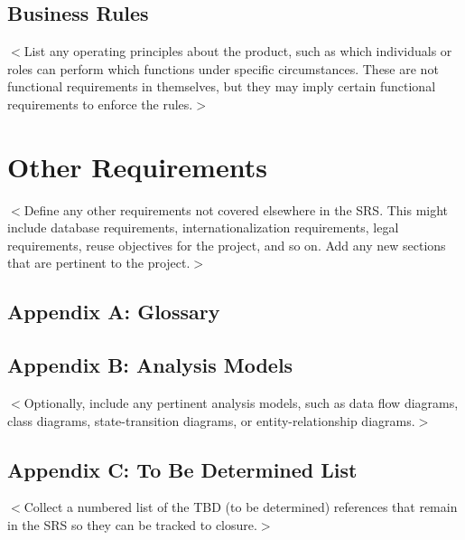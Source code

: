 \documentclass{scrreprt}
\begin{document}
\section{Business Rules}
$<$List any operating principles about the product, such as which individuals or 
roles can perform which functions under specific circumstances. These are not 
functional requirements in themselves, but they may imply certain functional 
requirements to enforce the rules.$>$


\chapter{Other Requirements}
$<$Define any other requirements not covered elsewhere in the SRS. This might 
include database requirements, internationalization requirements, legal 
requirements, reuse objectives for the project, and so on. Add any new sections 
that are pertinent to the project.$>$

\section{Appendix A: Glossary}
\printglossary[type=\acronymtype]

\section{Appendix B: Analysis Models}
$<$Optionally, include any pertinent analysis models, such as data flow 
diagrams, class diagrams, state-transition diagrams, or entity-relationship 
diagrams.$>$

\section{Appendix C: To Be Determined List}
$<$Collect a numbered list of the TBD (to be determined) references that remain 
in the SRS so they can be tracked to closure.$>$
\end{document}
